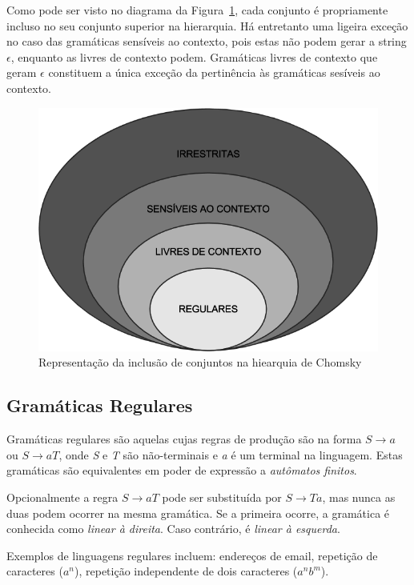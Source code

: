 \documentclass[a4paper,12pt,oneside,onecolumn]{uerj}
\begin{document}
Como pode ser visto no diagrama da Figura~\ref{fig:chomsky}, cada conjunto é propriamente incluso no seu conjunto superior na hierarquia. Há entretanto uma ligeira exceção no caso das gramáticas sensíveis ao contexto, pois estas não podem gerar a string $\epsilon$, enquanto as livres de contexto podem. Gramáticas livres de contexto que geram $\epsilon$ constituem a única exceção da pertinência às gramáticas sesíveis ao contexto.

\begin{figure}[!htbp]
  \centering
  \includegraphics[scale=0.5]{figures/chomsky.png}
  \caption{Representação da inclusão de conjuntos na hiearquia de Chomsky}
  \label{fig:chomsky}
\end{figure}

\subsection{Gramáticas Regulares}

Gramáticas regulares são aquelas cujas regras de produção são na forma $S \rightarrow a$ ou $S \rightarrow aT$, onde \emph{S} e \emph{T} são não-terminais e \emph{a} é um terminal na linguagem. Estas gramáticas são equivalentes em poder de expressão a \emph{autômatos finitos}. 

Opcionalmente a regra $S \rightarrow aT$ pode ser substituída por $S \rightarrow Ta$, mas nunca as duas podem ocorrer na mesma gramática. Se a primeira ocorre, a gramática é conhecida como \emph{linear à direita}. Caso contrário, é \emph{linear à esquerda}. \cite{bib:Chomsky58}

Exemplos de linguagens regulares incluem: endereços de email, repetição de caracteres ($a^n$), repetição independente de dois caracteres ($a^nb^m$).
\end{document}
